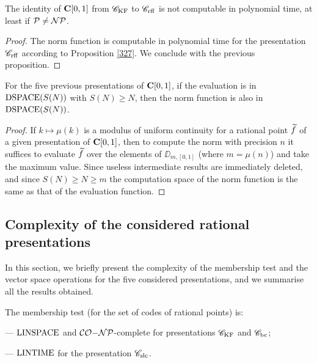 \begin{corollary} \label{435}
The identity of ${{\bf C}[0,1]}$ from ${{{\mathscr C}}_{\rm KF}}$ to ${{{\mathscr C}}_{\rm rff}}$ is not computable in polynomial time, at least if ${\cal P} \neq {\cal NP}$.
\end{corollary}
%
\begin{proof}
The norm function is computable in polynomial time for the presentation ${{{\mathscr C}}_{\rm rff}}$ according to Proposition \ref{327}. We conclude with the previous proposition. 
\end{proof}
 

\begin{proposition} \label{436}
For the five previous presentations of ${{\bf C}[0,1]}$, if the evaluation is in ${\rm DSPACE}(S(N))$ with $S(N) \geq N$, then the norm function is also in ${\rm DSPACE}(S(N))$.
\end{proposition}
%
\begin{proof}
If $k \mapsto \mu(k)$ is a modulus of uniform continuity for a rational point $\widetilde{f}$ of a given presentation of ${{\bf C}[0,1]}$, then to compute the norm with precision $n$ it suffices to evaluate $\widetilde{f}$ over the elements of $\DD_{m,[0,1]}$ (where $ m = \mu(n)$) and take the maximum value.
Since useless intermediate results are immediately deleted, and since $S(N) \geq N \geq m$ the computation space of the norm function is the same as that of the evaluation function. 
\end{proof}

\subsection{Complexity of the considered rational presentations}\label{subsec44}
In this section, we briefly present the complexity of the membership test and the vector space operations for the five considered presentations, and we summarise all the results obtained. 

\begin{proposition} \label{441}
The membership test (for the set of codes of rational points) is:

\noindent 
--- ${\rm LINSPACE}$ and ${\cal CO}{\rm-}{\cal NP}$-complete for  presentations ${{{\mathscr C}}_{\rm KF}}$ and ${{{\mathscr C}}_{\rm bc}}$; 

\noindent 
--- ${\rm LINTIME}$ for the presentation ${{{\mathscr C}}_{\rm slc}}$.
\end{proposition}
 
